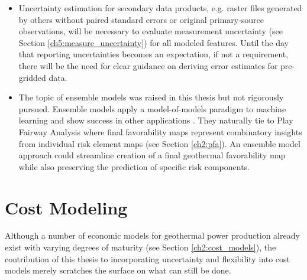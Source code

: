 \begin{itemize}
    \item Uncertainty estimation for secondary data products, e.g. raster files generated by others without paired standard errors or original primary-source observations, will be necessary to evaluate measurement uncertainty (see Section \ref{ch5:measure_uncertainty}) for all modeled features. Until the day that reporting uncertainties becomes an expectation, if not a requirement, there will be the need for clear guidance on deriving error estimates for pre-gridded data.
    \item The topic of ensemble models was raised in this thesis but not rigorously pursued. Ensemble models apply a model-of-models paradigm to machine learning and show success in other applications \citep[e.g.,][]{wilson_machine_2020}. They naturally tie to Play Fairway Analysis where final favorability maps represent combinatory insights from individual risk element maps (see Section \ref{ch2:pfa}). An ensemble model approach could streamline creation of a final geothermal favorability map while also preserving the prediction of specific risk components.
\end{itemize}

\section{Cost Modeling}\label{ch9:future_work_cm}

Although a number of economic models for geothermal power production already exist with varying degrees of maturity (see Section \ref{ch2:cost_models}), the contribution of this thesis to incorporating uncertainty and flexibility into cost models merely scratches the surface on what can still be done.

